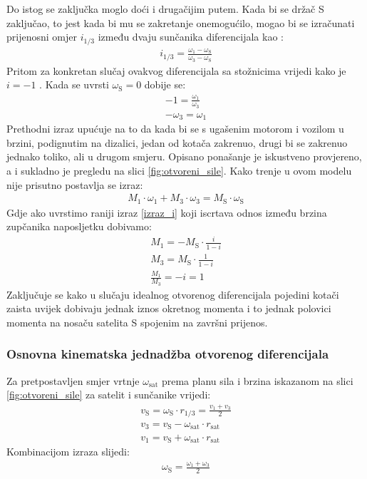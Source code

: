 \documentclass[11pt]{article}
\numberwithin{equation}{section}%
\begin{document}
Do istog se zaključka moglo doći i drugačijim putem. Kada bi se držač S zaključao, to jest kada bi mu se zakretanje onemogućilo, mogao bi se izračunati prijenosni omjer $i_{1/3}$ između dvaju sunčanika diferencijala kao \cite{genta2008automotive}:
%
\begin{gather}
i_{1/3}=\frac{\omega_1-\omega_\text{S}}{\omega_3-\omega_\text{S}} \label{izraz_i}
\end{gather}
%
Pritom za konkretan slučaj ovakvog diferencijala sa stožnicima vrijedi kako je $i=-1$ \cite{genta2008automotive}. Kada se uvrsti $\omega_\text{S}=0$ dobije se:
\begin{gather}
-1=\frac{\omega_1}{\omega_3}\\
-\omega_3=\omega_1 \label{nez}
\end{gather}
%
Prethodni izraz upućuje na to da kada bi se s ugašenim motorom i vozilom u brzini, podignutim na dizalici, jedan od kotača zakrenuo, drugi bi se zakrenuo jednako toliko, ali u drugom smjeru. Opisano ponašanje je iskustveno provjereno, a i sukladno je pregledu na slici \ref{fig:otvoreni_sile}. Kako trenje u ovom modelu nije prisutno postavlja se izraz:
%
\begin{gather}
M_1\cdot \omega_1+M_3\cdot \omega_3=M_\text{S}\cdot \omega_\text{S}
\end{gather}
Gdje ako uvrstimo raniji izraz \ref{izraz_i} koji iscrtava odnos između brzina zupčanika naposljetku dobivamo:
\begin{gather}
M_1=-M_\text{S}\cdot \frac{i}{1-i}\\
M_3=M_\text{S}\cdot \frac{1}{1-i}\\
\frac{M_1}{M_3}=-i=1
\end{gather}
Zaključuje se kako u slučaju idealnog otvorenog diferencijala pojedini kotači zaista uvijek dobivaju jednak iznos okretnog momenta i to jednak polovici momenta na nosaču satelita S spojenim na završni prijenos.

\subsubsection{Osnovna kinematska jednadžba otvorenog diferencijala}

Za pretpostavljen smjer vrtnje $\omega_\text{sat}$ prema planu sila i brzina iskazanom na slici \ref{fig:otvoreni_sile} za satelit i sunčanike vrijedi:
%
\begin{gather}
v_\text{S}=\omega_\text{S}\cdot r_{1/3}=\frac{v_1+v_3}{2}\\
v_3=v_\text{S}-\omega_\text{sat}\cdot r_\text{sat}\\
v_1=v_\text{S}+\omega_\text{sat}\cdot r_\text{sat}
\end{gather} 
%
Kombinacijom izraza slijedi:
\begin{gather}
\omega_\text{S}=\frac{\omega_1+
 \omega_3}{2} \label{kinjeddif}
\end{gather}
\end{document}
